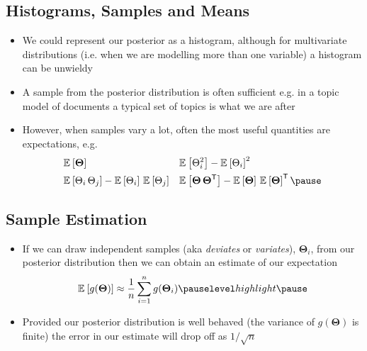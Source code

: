 
\begin{slide}
\section{Histograms, Samples and Means}

\begin{PauseHighLight}
  \begin{itemize}
  \item We could represent our posterior as a histogram, although for
    multivariate distributions (i.e. when we are modelling more than one
    variable) a histogram can be unwieldy\pause
  \item A sample from the posterior distribution is often sufficient
    e.g. in a topic model of documents a typical set of topics is what we
    are after\pause
  \item However, when samples vary a lot, often the most useful quantities
    are expectations, e.g.
    \begin{align*}
      &\av{\bm{\Theta}} & &\av{\Theta_i^2}-\av{\Theta_i}^2 \\
      &\av{\Theta_i\,\Theta_j} - \av{\Theta_i}\,\av{\Theta_j}
      && \av{\bm{\Theta}\,\bm{\Theta}^\tr} -\av{\bm{\Theta}}\,\av{\bm{\Theta}}^\tr\pause
    \end{align*}
  \end{itemize}
\end{PauseHighLight}

\end{slide}


\begin{slide}
\section[-2]{Sample Estimation}

\pb\pause{}
\begin{itemize}
\item If we can draw independent samples (aka \emph{deviates} or
  \emph{variates}), $\bm{\Theta}_i$, from our posterior distribution then we can
  obtain an estimate of our expectation
  \begin{align*}
    \av{g(\bm{\Theta})} \approx \frac{1}{n} \sum_{i=1}^n g(\bm{\Theta}_i)\pauseh
  \end{align*}
\item Provided our posterior distribution is well behaved (the
  variance of $g(\bm{\Theta})$ is finite) the error in our estimate
  will drop off as $1/\sqrt{n}$\pauseh
  \begin{center}
    \pause   
  \end{center}
\end{itemize}

\end{slide}


